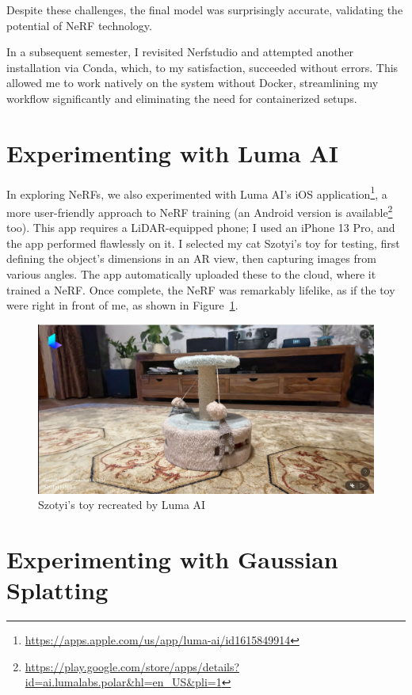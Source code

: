 Despite these challenges, the final model was surprisingly accurate, validating the potential of NeRF technology. 

In a subsequent semester, I revisited Nerfstudio and attempted another installation via Conda, which, to my satisfaction, succeeded without errors. This allowed me to work natively on the system without Docker, streamlining my workflow significantly and eliminating the need for containerized setups.


\section{Experimenting with Luma AI}

In exploring NeRFs, we also experimented with Luma AI’s iOS application\footnote{\url{https://apps.apple.com/us/app/luma-ai/id1615849914}}, a more user-friendly approach to NeRF training (an Android version is available\footnote{\url{https://play.google.com/store/apps/details?id=ai.lumalabs.polar&hl=en_US&pli=1}} too). This app requires a LiDAR-equipped phone; I used an iPhone 13 Pro, and the app performed flawlessly on it. I selected my cat Szotyi’s toy for testing, first defining the object’s dimensions in an AR view, then capturing images from various angles. The app automatically uploaded these to the cloud, where it trained a NeRF. Once complete, the NeRF was remarkably lifelike, as if the toy were right in front of me, as shown in Figure~\ref{fig:luma_ai_szotyi_toy}.

\begin{figure}[htbp]
	\centering
	\includegraphics[width=150mm, keepaspectratio]{figures_jpg/szotyi_jateka_luma_ai.jpg}
	\caption{Szotyi's toy recreated by Luma AI}
	\label{fig:luma_ai_szotyi_toy}
\end{figure}

\section{Experimenting with Gaussian Splatting}

